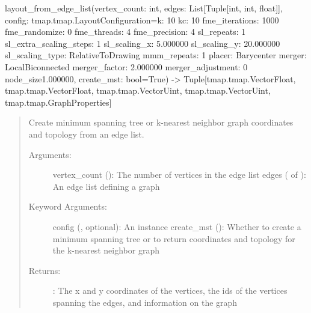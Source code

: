\documentclass[letterpaper,10pt,english]{sphinxmanual}
\begin{document}

\begin{fulllineitems}
\label{\detokenize{documentation:tmap.layout_from_edge_list}}
layout\_from\_edge\_list(vertex\_count: int, edges: List{[}Tuple{[}int, int, float{]}{]}, config: tmap.tmap.LayoutConfiguration=k: 10
kc: 10
fme\_iterations: 1000
fme\_randomize: 0
fme\_threads: 4
fme\_precision: 4
sl\_repeats: 1
sl\_extra\_scaling\_steps: 1
sl\_scaling\_x: 5.000000
sl\_scaling\_y: 20.000000
sl\_scaling\_type: RelativeToDrawing
mmm\_repeats: 1
placer: Barycenter
merger: LocalBiconnected
merger\_factor: 2.000000
merger\_adjustment: 0
node\_size1.000000, create\_mst: bool=True) -\textgreater{} Tuple{[}tmap.tmap.VectorFloat, tmap.tmap.VectorFloat, tmap.tmap.VectorUint, tmap.tmap.VectorUint, tmap.tmap.GraphProperties{]}
\begin{quote}

Create minimum spanning tree or k-nearest neighbor graph coordinates and topology from an edge list.
\begin{description}
\item[{Arguments:}] \leavevmode
vertex\_count (): The number of vertices in the edge list
edges ( of ): An edge list defining a graph

\item[{Keyword Arguments:}] \leavevmode
config ({\hyperref[\detokenize{documentation:tmap.LayoutConfiguration}]{}}, optional): An {\hyperref[\detokenize{documentation:tmap.LayoutConfiguration}]{}} instance
create\_mst (): Whether to create a minimum spanning tree or to return coordinates and topology for the k-nearest neighbor graph

\item[{Returns:}] \leavevmode
{}: The x and y coordinates of the vertices, the ids of the vertices spanning the edges, and information on the graph

\end{description}
\end{quote}

\end{fulllineitems}
\end{document}
